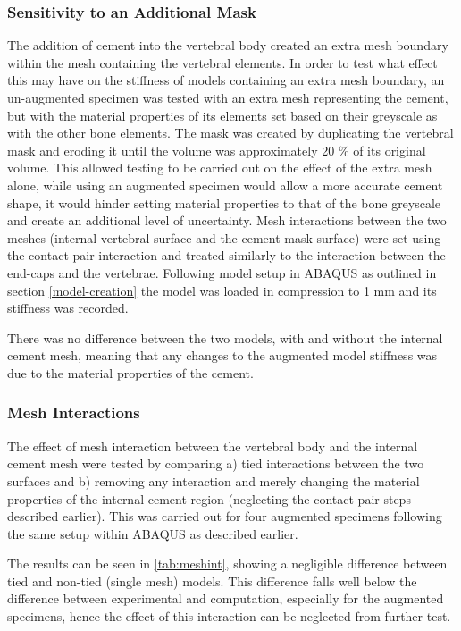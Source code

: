\subsubsection{Sensitivity to an Additional
Mask}\label{sensitivity-to-an-additional-mask}

The addition of cement into the vertebral body created an extra mesh boundary
within the mesh containing the vertebral elements. In order to test what effect
this may have on the stiffness of models containing an extra mesh boundary, an
un-augmented specimen was tested with an extra mesh representing the cement,
but with the material properties of its elements set based on their greyscale
as with the other bone elements.  The mask was created by duplicating the
vertebral mask and eroding it until the volume was approximately 20 \% of its
original volume. This allowed testing to be carried out on the effect of the
extra mesh alone, while using an augmented specimen would allow a more accurate
cement shape, it would hinder setting material properties to that of the bone
greyscale and create an additional level of uncertainty. Mesh interactions
between the two meshes (internal vertebral surface and the cement mask surface)
were set using the contact pair interaction and treated similarly to the
interaction between the end-caps and the vertebrae. Following model setup in
ABAQUS as outlined in section \ref{model-creation} the model was loaded in
compression to 1 mm and its stiffness was recorded.

There was no difference between the two models, with and without the internal
cement mesh, meaning that any changes to the augmented model stiffness was due
to the material properties of the cement.

\subsubsection{Mesh Interactions}\label{mesh-interactions}

The effect of mesh interaction between the vertebral body and the internal
cement mesh were tested by comparing a) tied interactions between the two
surfaces and b) removing any interaction and merely changing the material
properties of the internal cement region (neglecting the contact pair steps
described earlier). This was carried out for four augmented specimens following
the same setup within ABAQUS as described earlier.

The results can be seen in \cref{tab:meshint}, showing a negligible difference
between tied and non-tied (single mesh) models. This difference falls well
below the difference between experimental and computation, especially for the
augmented specimens, hence the effect of this interaction can be neglected from
further test.

